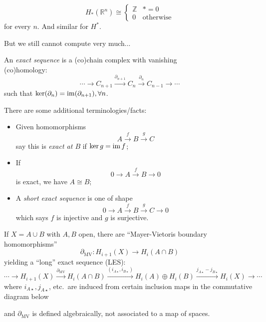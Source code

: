 \documentclass[a4paper,11pt]{article}
\begin{document}
	\begin{cor}
		\[
			H_* (\mathbb{R}^n) \cong \begin{cases}
				\mathbb{Z} & * = 0\\
				0 & \text{otherwise}
			\end{cases}
		\]
		for every $n$. And similar for $H^*$.
	\end{cor}

	But we still cannot compute very much... 

	\begin{defi}
		An \emph{exact sequence} is a (co)chain complex with vanishing\\(co)homology:
		\[
			\cdots \to C_{n+1} \xrightarrow{\partial_{n+1}} C_n \xrightarrow{\partial_n} C_{n-1} \to \cdots
		\]
		such that $\ker(\partial_n) = \operatorname{im}(\partial_{n+1}), \forall n$. 
	\end{defi}

	\begin{nt}
		There are some additional terminologies/facts:
		\begin{itemize}
			\item Given homomorphisms \[
				A \xrightarrow{f} B \xrightarrow{g} C
			\]
			say this is \emph{exact at $B$} if $\ker g = \operatorname{im} f$;
			\item If \[
				0 \to A \xrightarrow{f} B \to 0
			\]
			is exact, we have $A \cong B$;
			\item A \emph{short exact sequence} is one of shape \[
				0 \to A \xrightarrow{f} B \xrightarrow{g} C \to 0
			\]
			which says $f$ is injective and $g$ is surjective.
		\end{itemize}
	\end{nt}

	\begin{thm}
		If $X = A \cup B$ with $A,B$ open, there are ``Mayer-Vietoris boundary homomorphisms''
		\[
			\partial_{\text{MV}} : H_{i+1}(X) \to H_i (A \cap B)
		\]
		yielding a ``long'' exact sequence (LES):
		\[
			\cdots \to H_{i+1}(X) \xrightarrow{\partial_{\text{MV}}} H_i (A\cap B) \xrightarrow{(i_{A\star},i_{B\star})} H_i(A) \oplus H_i(B) \xrightarrow{j_{A\star}-j_{B\star}} H_i(X) \to \cdots
		\]
		where $i_{A\star}, j_{A\star}$, etc.\ are induced from certain inclusion maps in the commutative diagram below
		\begin{center}
		\end{center}
		and $\partial_{\text{MV}}$ is defined algebraically, not associated to a map of spaces.
	\end{thm}
\end{document}
